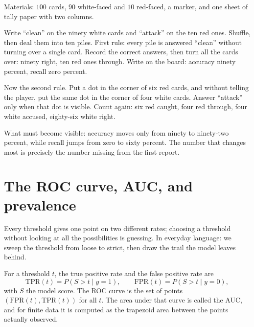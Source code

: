 \begin{tangan}
Materials: $100$ cards, $90$ white-faced and $10$ red-faced, a marker, and one sheet of tally paper
with two columns.

Write ``clean'' on the ninety white cards and ``attack'' on the ten red ones. Shuffle, then deal
them into ten piles. First rule: every pile is answered ``clean'' without turning over a single
card. Record the correct answers, then turn all the cards over: ninety right, ten red ones through.
Write on the board: accuracy ninety percent, recall zero percent.

Now the second rule. Put a dot in the corner of six red cards, and without telling the player, put
the same dot in the corner of four white cards. Answer ``attack'' only when that dot is visible.
Count again: six red caught, four red through, four white accused, eighty-six white right.

What must become visible: accuracy moves only from ninety to ninety-two percent, while recall jumps
from zero to sixty percent. The number that changes most is precisely the number missing from the
first report.
\end{tangan}

\section{The ROC curve, AUC, and prevalence}

Every threshold gives one point on two different rates; choosing a threshold without looking at all
the possibilities is guessing. In everyday language: we sweep the threshold from loose to strict,
then draw the trail the model leaves behind.


\begin{definisi}
For a threshold $t$, the true positive rate and the false positive rate are
\[
\mathrm{TPR}(t)=P(S>t\mid y=1),\qquad \mathrm{FPR}(t)=P(S>t\mid y=0),
\]
with $S$ the model score. The ROC curve is the set of points $(\mathrm{FPR}(t),\mathrm{TPR}(t))$
for all $t$. The area under that curve is called the AUC, and for finite data it is computed as the
trapezoid area between the points actually observed.
\end{definisi}

